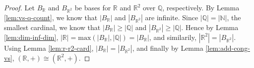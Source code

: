 \documentclass[12pt]{article}
\begin{document}
  \begin{proof}
    Let $B_{\mathbb{R}}$ and $B_{\mathbb{R}^2}$ be bases for $\mathbb{R}$ and $\mathbb{R}^2$ over $\mathbb{Q}$, respectively. By Lemma \ref{lem:vs-q-count}, we know that $|B_{\mathbb{R}}|$ and $|B_{\mathbb{R}^2}|$ are infinite. Since $|\mathbb{Q}|=|\mathbb{N}|$, the smallest cardinal, we know that $|B_{\mathbb{R}}| \geq |\mathbb{Q}|$ and $|B_{\mathbb{R}^2}| \geq |\mathbb{Q}|$. Hence by Lemma \ref{lem:dim-inf-dim}, $|\mathbb{R}|=\text{max}(|B_{\mathbb{R}}|, |\mathbb{Q}|)=|B_{\mathbb{R}}|$, and similarily, $|\mathbb{R}^2|=|B_{\mathbb{R}^2}|$. Using Lemma \ref{lem:r-r2-card}, $|B_{\mathbb{R}}|=|B_{\mathbb{R}^2}|$, and finally by Lemma \ref{lem:add-cong-vs}, $(\mathbb{R},+)\cong (\mathbb{R}^2,+)$.
  \end{proof}
\end{document}

